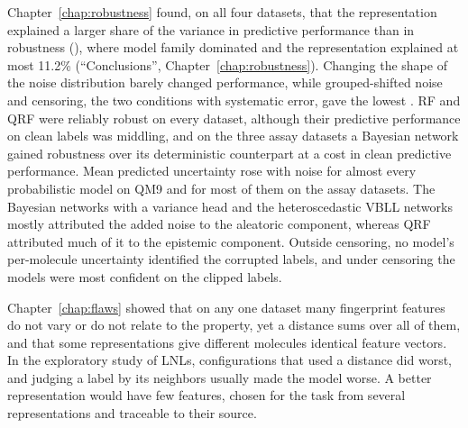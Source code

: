 Chapter~\ref{chap:robustness} found, on all four datasets, that the representation explained a larger share of the variance in predictive performance than in robustness (\aucnorm), where model family dominated and the representation explained at most 11.2\% (``Conclusions'', Chapter~\ref{chap:robustness}). Changing the shape of the noise distribution barely changed performance, while grouped-shifted noise and censoring, the two conditions with systematic error, gave the lowest \aucnorm{}. RF and QRF were reliably robust on every dataset, although their predictive performance on clean labels was middling, and on the three assay datasets a Bayesian network gained robustness over its deterministic counterpart at a cost in clean predictive performance. Mean predicted uncertainty rose with noise for almost every probabilistic model on QM9 and for most of them on the assay datasets. The Bayesian networks with a variance head and the heteroscedastic VBLL networks mostly attributed the added noise to the aleatoric component, whereas QRF attributed much of it to the epistemic component. Outside censoring, no model's per-molecule uncertainty identified the corrupted labels, and under censoring the models were most confident on the clipped labels.

Chapter~\ref{chap:flaws} showed that on any one dataset many fingerprint features do not vary or do not relate to the property, yet a distance sums over all of them, and that some representations give different molecules identical feature vectors. In the exploratory study of LNLs, configurations that used a distance did worst, and judging a label by its neighbors usually made the model worse. A better representation would have few features, chosen for the task from several representations and traceable to their source.

